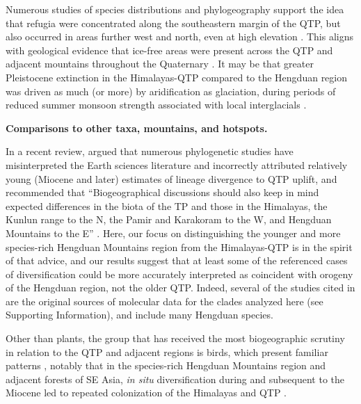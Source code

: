 Numerous studies of species distributions \citep[e.g.,][]{srinivasan2014,lopez2011} and phylogeography \citep[e.g.,][]{CunY2010,WangBS2011,lei2014,meng2015} support the idea that refugia were concentrated along the southeastern margin of the QTP, but also occurred in areas further west and north, even at high elevation \citep[e.g.,][]{wang2009,sun2010,opgenoorth2010}. This aligns with geological evidence that ice-free areas were present across the QTP and adjacent mountains throughout the Quaternary \citep[see][]{owen2014}. It may be that greater Pleistocene extinction in the Himalayas-QTP compared to the Hengduan region was driven as much (or more) by aridification as glaciation, during periods of reduced summer monsoon strength associated with local interglacials \citep{owen2008}.



\textbf{Comparisons to other taxa, mountains, and hotspots.}

In a recent review, \citet{Renner2016} argued that numerous phylogenetic studies have misinterpreted the Earth sciences literature and incorrectly attributed relatively young (Miocene and later) estimates of lineage divergence to QTP uplift, and recommended that ``Biogeographical discussions should also keep in mind expected differences in the biota of the TP and those in the Himalayas, the Kunlun range to the N, the Pamir and Karakoram to the W, and Hengduan Mountains to the E'' \citep[][p.~7]{Renner2016}. Here, our focus on distinguishing the younger and more species-rich Hengduan Mountains region from the Himalayas-QTP is in the spirit of that advice, and our results suggest that at least some of the referenced cases of diversification could be more accurately interpreted as coincident with orogeny of the Hengduan region, not the older QTP. Indeed, several of the studies cited in \citet{Renner2016} are the original sources of molecular data for the clades analyzed here (see Supporting Information), and include many Hengduan species.

Other than plants, the group that has received the most biogeographic scrutiny in relation to the QTP and adjacent regions is birds, which present familiar patterns \citep[see][]{packert2015}, notably that in the species-rich Hengduan Mountains region and adjacent forests of SE Asia, \textit{in situ} diversification during and subsequent to the Miocene led to repeated colonization of the Himalayas and QTP \citep[e.g.,][]{liu2016,tietze2013,johansson2007}.


